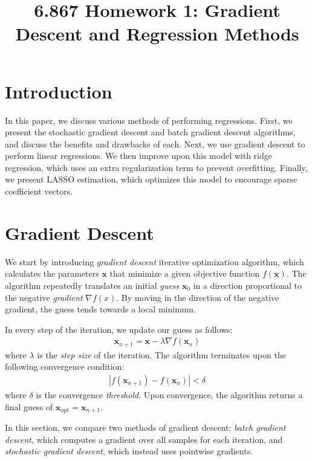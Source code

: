\documentclass[10pt]{paper}
\title{6.867 Homework 1: Gradient Descent and Regression Methods}
\begin{document}
\maketitle
\vspace{-50px}

\section{Introduction}

In this paper, we discuss various methods of performing regressions. First, we present the stochastic gradient descent and batch gradient descent algorithms, and discuss the benefits and drawbacks of each. Next, we use gradient descent to perform linear regressions. We then improve upon this model with ridge regression, which uses an extra regularization term to prevent overfitting. Finally, we present LASSO estimation, which optimizes this model to encourage sparse coefficient vectors. 

\section{Gradient Descent}

We start by introducing \emph{gradient descent} iterative optimization algorithm, which calculates the parameters $\mathbf{x}$ that minimize a given objective function $f(\mathbf{x})$. The algorithm repeatedly translates an initial \emph{guess} $\mathbf{x}_0$ in a direction proportional to the negative \emph{gradient} $\nabla f(x)$. By moving in the direction of the negative gradient, the guess tends towards a local minimum.

In every step of the iteration, we update our guess as follows:
\begin{align*}
\mathbf{x}_{n+1} = \mathbf{x} - \lambda \nabla f(\mathbf{x}_{n})
\end{align*}
where $\lambda$ is the \emph{step size} of the iteration. The algorithm terminates upon the following convergence condition: 
\begin{align*}
|f(\mathbf{x}_{n+1}) - f(\mathbf{x}_{n})| < \delta
\end{align*}
where $\delta$ is the convergence \emph{threshold}. Upon convergence, the algorithm returns a final guess of $\mathbf{x}_{\text{opt}} = \mathbf{x}_{n+1}$.

In this section, we compare two methods of gradient descent: \emph{batch gradient descent}, which computes a gradient over all samples for each iteration, and \emph{stochastic gradient descent}, which instead uses pointwise gradients.
\end{document}
